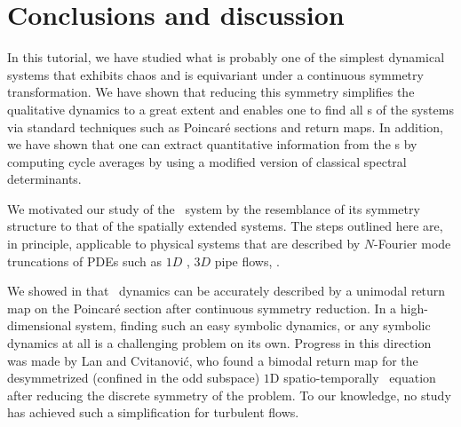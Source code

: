 \section{Conclusions and discussion}
\label{s:concl}

In this tutorial, we have studied what is probably one of the simplest dynamical systems that
exhibits chaos and is equivariant under a continuous symmetry transformation.
We have shown that reducing this symmetry simplifies the qualitative dynamics
to a great extent and enables one to find all \rpo s of the systems via
standard techniques such as Poincar\'e sections and return maps. In
addition, we have shown that one can extract quantitative information
from the \rpo s by computing cycle averages by using a modified version of
classical spectral determinants.

We motivated our study of the \twomode\ system by the resemblance of its
symmetry structure to that of the spatially extended systems. The
steps outlined here are, in principle, applicable to physical systems
that are described by $N$-Fourier mode truncations of PDEs such as $1D$
\KS{}, $3D$ pipe flows, \etc.

We showed in  that \twomode\ dynamics can be accurately
described by a unimodal return map on the Poincar\'e section after continuous 
symmetry reduction. In a high-dimensional system, finding such an easy symbolic 
dynamics, or any symbolic dynamics at all is a challenging problem on its own. 
Progress in this direction was made by Lan and Cvitanovi\'{c}, who found a bimodal 
return map for the desymmetrized (confined in the odd subspace) $1$D spatio-temporally \KS\ 
equation  after reducing the discrete symmetry of the problem. To our
knowledge, no study has achieved such a simplification for turbulent flows.

